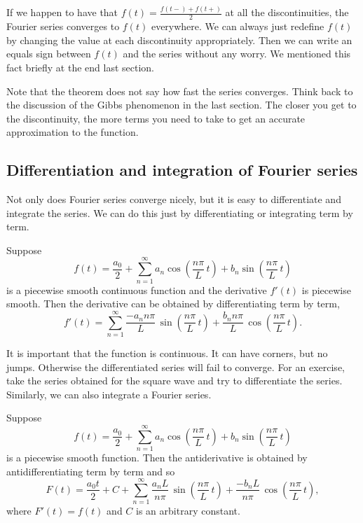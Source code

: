 If we happen to have that
$f(t) = \frac{f(t-)+f(t+)}{2}$ at all the discontinuities, the Fourier series
converges to $f(t)$ everywhere.  We can always just redefine $f(t)$
by changing the value at each discontinuity appropriately.  Then we can write
an equals sign between $f(t)$ and the series without any worry.
We mentioned this fact
briefly at the end last section.

Note that the theorem does not say how fast the series converges.
Think back to the discussion of the Gibbs phenomenon in the last section.
The closer you get to the discontinuity, the more terms you need to take
to get an accurate approximation to the function.

\subsection{Differentiation and integration of Fourier series}

Not only does Fourier series converge nicely, but it is easy to differentiate
and integrate the series.  We can do this just by differentiating or
integrating term by term.

\begin{theorem}
Suppose
\begin{equation*}
f(t) = \frac{a_0}{2} + \sum_{n=1}^\infty a_n \cos \left( \frac{n \pi}{L} \, t
\right)
+ b_n \sin \left( \frac{n \pi}{L} \, t \right)
\end{equation*}
is a piecewise smooth continuous function and the derivative $f'(t)$ is
piecewise smooth.  Then the derivative can be
obtained by differentiating term by term,
\begin{equation*}
f'(t) = \sum_{n=1}^\infty \frac{-a_n n \pi}{L} \,
\sin \left( \frac{n \pi}{L} \, t \right)
+ \frac{b_n n \pi}{L} \, \cos \left( \frac{n \pi}{L} \, t \right) .
\end{equation*}
\end{theorem}

It is important that the function is continuous.  It can have corners, but no
jumps.  Otherwise the differentiated series will fail to converge.  For an
exercise, take the series obtained for the square wave and try to
differentiate the series.  Similarly, we can also integrate a Fourier series.

\begin{theorem}
Suppose
\begin{equation*}
f(t) = \frac{a_0}{2} + \sum_{n=1}^\infty
a_n \cos \left( \frac{n \pi}{L} \, t \right)
+ b_n \sin \left( \frac{n \pi}{L} \, t \right)
\end{equation*}
is a piecewise smooth function.  Then the antiderivative is
obtained by antidifferentiating term by term and so
\begin{equation*}
F(t) = \frac{a_0 t}{2} + C + \sum_{n=1}^\infty
\frac{a_n L}{n \pi} \, \sin \left( \frac{n \pi}{L} \, t \right)
+ \frac{-b_n L}{n \pi} \, \cos \left( \frac{n \pi}{L} \, t \right) ,
\end{equation*}
where $F'(t) = f(t)$ and $C$ is an arbitrary constant.
\end{theorem}

